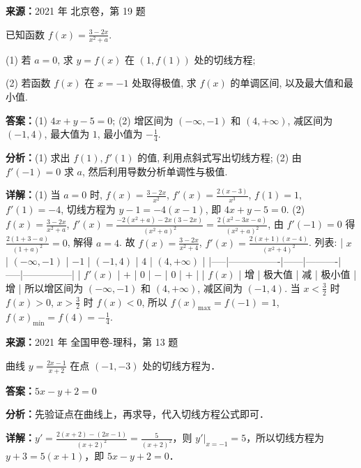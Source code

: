 \begin{question}[points=15]
\textbf{来源：}2021 年 北京卷，第 19 题\par
已知函数 $f(x)=\frac{3-2x}{x^2+a}$.

(1) 若 $a=0$, 求 $y=f(x)$ 在 $(1,f(1))$ 处的切线方程;

(2) 若函数 $f(x)$ 在 $x=-1$ 处取得极值, 求 $f(x)$ 的单调区间, 以及最大值和最小值.
\begin{solution}
\textbf{答案：}(1) $4x+y-5=0$; (2) 增区间为 $(-\infty,-1)$ 和 $(4,+\infty)$, 减区间为 $(-1,4)$, 最大值为 $1$, 最小值为 $-\frac{1}{4}$.

\textbf{分析：}(1) 求出 $f(1),f'(1)$ 的值, 利用点斜式写出切线方程; (2) 由 $f'(-1)=0$ 求 $a$, 然后利用导数分析单调性与极值.

\textbf{详解：}(1) 当 $a=0$ 时, $f(x)=\frac{3-2x}{x^2}$, $f'(x)=\frac{2(x-3)}{x^3}$, $f(1)=1$, $f'(1)=-4$, 切线方程为 $y-1=-4(x-1)$, 即 $4x+y-5=0$.
(2) $f(x)=\frac{3-2x}{x^2+a}$, $f'(x)=\frac{-2(x^2+a)-2x(3-2x)}{(x^2+a)^2}=\frac{2(x^2-3x-a)}{(x^2+a)^2}$, 由 $f'(-1)=0$ 得 $\frac{2(1+3-a)}{(1+a)^2}=0$, 解得 $a=4$. 故 $f(x)=\frac{3-2x}{x^2+4}$, $f'(x)=\frac{2(x+1)(x-4)}{(x^2+4)^2}$. 列表:
| $x$ | $(-\infty,-1)$ | $-1$ | $(-1,4)$ | $4$ | $(4,+\infty)$ |
|-----|----------------|------|----------|-----|---------------|
| $f'(x)$ | $+$ | $0$ | $-$ | $0$ | $+$ |
| $f(x)$ | 增 | 极大值 | 减 | 极小值 | 增 |
所以增区间为 $(-\infty,-1)$ 和 $(4,+\infty)$, 减区间为 $(-1,4)$. 当 $x<\frac{3}{2}$ 时 $f(x)>0$, $x>\frac{3}{2}$ 时 $f(x)<0$, 所以 $f(x)_{\max}=f(-1)=1$, $f(x)_{\min}=f(4)=-\frac{1}{4}$.
\end{solution}
\end{question}

\begin{question}[points=5]
\textbf{来源：}2021 年 全国甲卷-理科，第 13 题\par
曲线 $y = \frac{2x-1}{x+2}$ 在点 $(-1, -3)$ 处的切线方程为．
\fillin[{$5x - y + 2 = 0$}]
\begin{solution}
\textbf{答案：}$5x - y + 2 = 0$

\textbf{分析：}先验证点在曲线上，再求导，代入切线方程公式即可．

\textbf{详解：}$y' = \frac{2(x+2)- (2x-1)}{(x+2)^2} = \frac{5}{(x+2)^2}$，则 $y'|_{x=-1} = 5$，所以切线方程为 $y+3=5(x+1)$，即 $5x - y + 2 = 0$．
\end{solution}
\end{question}

